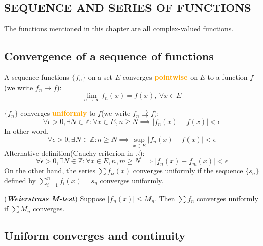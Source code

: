 \documentclass{article}
\begin{document}
\begin{multicols}{2}

\tableofcontents
\clearpage







\section{SEQUENCE AND SERIES OF FUNCTIONS}
\begin{notebox}
The functions mentioned in this chapter are all complex-valued functions.
\end{notebox}

\subsection{Convergence of a sequence of functions}

\begin{definition}
A sequence functions $\{f_n\}$ on a set $E$ converges \textbf{\textcolor{orange}{pointwise}} on $E$ to a function $f$(we write $f_n\to f$):
$$\lim_{n\to \infty}f_n(x) = f(x),\ \forall x\in E$$
\end{definition}

\begin{definition}
$\{f_n\}$ converges \textbf{\textcolor{orange}{uniformly}} to $f$(we write $f_n\rightrightarrows f)$:
$$\forall \epsilon>0, \exists N\in \mathbb{Z}: \forall x\in E,n\geq N \implies |f_n(x)-f(x)|<\epsilon$$
In other word,
$$\forall \epsilon>0, \exists N\in \mathbb{Z}:n\geq N \implies \sup_{x\in E}|f_n(x)-f(x)|<\epsilon$$
Alternative definition(Cauchy criterion in $\mathbb{R}$):
$$\forall \epsilon>0, \exists N\in \mathbb{Z}:\forall x\in E, n,m\geq N \implies |f_n(x)-f_m(x)|<\epsilon$$
On the other hand, the series $\sum f_n(x)$ converges uniformly if the sequence $\{s_n\}$ defined by $\displaystyle \sum_{i=1}^n f_i(x)=s_n$ converges uniformly.
\end{definition}

\begin{theorem}
(\textbf{\emph{Weierstrass M-test}}) Suppose $|f_n(x)|\leq M_n$. Then $\sum f_n$ converges uniformly if $\sum M_n$ converges.
\end{theorem}

\subsection{Uniform converges and continuity}


\end{multicols}
\end{document}
